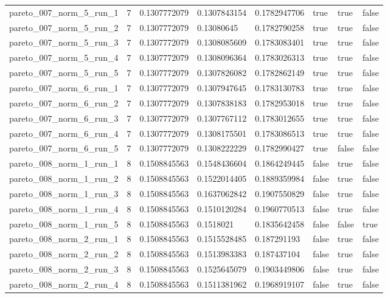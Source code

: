 \begin{tabular}{@{}llllllll@{}}
pareto\_007\_norm\_5\_run\_1 & 7 & 0.1307772079 & 0.1307843154 & 0.1782947706 & true & true & false \\
pareto\_007\_norm\_5\_run\_2 & 7 & 0.1307772079 & 0.13080645 & 0.1782790258 & true & true & false \\
pareto\_007\_norm\_5\_run\_3 & 7 & 0.1307772079 & 0.1308085609 & 0.1783083401 & true & true & false \\
pareto\_007\_norm\_5\_run\_4 & 7 & 0.1307772079 & 0.1308096364 & 0.1783026313 & true & true & false \\
pareto\_007\_norm\_5\_run\_5 & 7 & 0.1307772079 & 0.1307826082 & 0.1782862149 & true & true & false \\
pareto\_007\_norm\_6\_run\_1 & 7 & 0.1307772079 & 0.1307947645 & 0.1783130783 & true & true & false \\
pareto\_007\_norm\_6\_run\_2 & 7 & 0.1307772079 & 0.1307838183 & 0.1782953018 & true & true & false \\
pareto\_007\_norm\_6\_run\_3 & 7 & 0.1307772079 & 0.1307767112 & 0.1783012655 & true & true & false \\
pareto\_007\_norm\_6\_run\_4 & 7 & 0.1307772079 & 0.1308175501 & 0.1783086513 & true & true & false \\
pareto\_007\_norm\_6\_run\_5 & 7 & 0.1307772079 & 0.1308222229 & 0.1782990427 & true & false & false \\
pareto\_008\_norm\_1\_run\_1 & 8 & 0.1508845563 & 0.1548436604 & 0.1864249445 & false & true & false \\
pareto\_008\_norm\_1\_run\_2 & 8 & 0.1508845563 & 0.1522014405 & 0.1889359984 & false & true & false \\
pareto\_008\_norm\_1\_run\_3 & 8 & 0.1508845563 & 0.1637062842 & 0.1907550829 & false & true & false \\
pareto\_008\_norm\_1\_run\_4 & 8 & 0.1508845563 & 0.1510120284 & 0.1960770513 & false & true & false \\
pareto\_008\_norm\_1\_run\_5 & 8 & 0.1508845563 & 0.1518021 & 0.1835642458 & false & false & true \\
pareto\_008\_norm\_2\_run\_1 & 8 & 0.1508845563 & 0.1515528485 & 0.187291193 & false & true & false \\
pareto\_008\_norm\_2\_run\_2 & 8 & 0.1508845563 & 0.1513983383 & 0.187437104 & false & true & false \\
pareto\_008\_norm\_2\_run\_3 & 8 & 0.1508845563 & 0.1525645079 & 0.1903449806 & false & true & false \\
pareto\_008\_norm\_2\_run\_4 & 8 & 0.1508845563 & 0.1511381962 & 0.1968919107 & false & true & false \\

\end{tabular}
